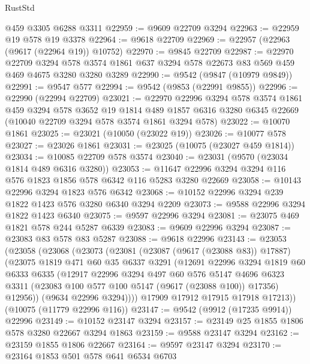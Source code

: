 \begin{lexlean}{RustStd}
\begin{coremodule}
{\begin{coremodule}
{{{{{{{{{{{{{{{{{{{{{{{{{{{{{{{{{    @459
    @3305
    @6288
    @3311
@22959 := @9609 @22709 @3294
@22963 := @22959 @19 @578 @19 @3378
@22964 := @9618 @22709
@22969 := @22957 (@22963 (@9617 (@22964 @19)) @10752)
@22970 := @9845 @22709
@22987 := @22970
    @22709
    @3294
    @578
    @3574
    @1861
    @637
    @3294
    @578
    @22673
    @83
    @569
    @459
    @469
    @4675
    @3280
    @3280
    @3289
@22990 := @9542 (@9847 (@10979 @9849))
@22991 := @9547 @577
@22994 := @9542 (@9853 (@22991 @9855))
@22996 := @22990 (@22994 @22709)
@23021 := @22970
    @22996
    @3294
    @578
    @3574
    @1861
    @459
    @3294
    @578
    @3652
    @19
    @1814
    @489
    @1857
    @6316
    @3280
    @6345
    @22669
    (@10040 @22709 @3294 @578 @3574 @1861 @3294 @578)
@23022 := @10070 @1861
@23025 := @23021 (@10050 (@23022 @19))
@23026 := @10077 @578
@23027 := @23026 @1861
@23031 := @23025 (@10075 (@23027 @459 @1814))
@23034 := @10085 @22709 @578 @3574
@23040 := @23031 (@9570 (@23034 @1814 @489 @6316 @3280))
@23053 := @11647 @22996 @3294 @3294 @116 @576 @1823 @1856 @578 @6342 @116 @5283 @3280 @22669
@23058 := @10143 @22996 @3294 @1823 @576 @6342
@23068 := @10152 @22996 @3294 @239 @1822 @1423 @576 @3280 @6340 @3294 @2209
@23073 := @9588 @22996 @3294 @1822 @1423 @6340
@23075 := @9597 @22996 @3294
@23081 := @23075 @469 @1821 @578 @244 @5287 @6339
@23083 := @9609 @22996 @3294
@23087 := @23083 @83 @578 @83 @5287
@23088 := @9618 @22996
@23143 := @23053
    (@23058
      (@23068
        (@23073
          (@23081
            (@23087 (@9617 (@23088 @83)) @17887)
            (@23075
              @1819
              @471
              @60
              @35
              @6337
              @3291
              (@12691
                @22996
                @3294
                @1819
                @60
                @6333
                @6335
                (@12917
                  @22996
                  @3294
                  @497
                  @60
                  @576
                  @5147
                  @4696
                  @6323
                  @3311
                  (@23083 @100 @577 @100 @5147 (@9617 (@23088 @100)) @17356)
                  @12956))
              (@9634 @22996 @3294))))
        @17909
        @17912
        @17915
        @17918
        @17213))
    (@10075 (@11779 @22996 @116))
@23147 := @9542 (@9912 (@17235 @9914)) @22996
@23149 := @10152 @23147 @3294
@23157 := @23149 @25 @1855 @1806 @578 @3280 @22667 @3294 @1863
@23159 := @9588 @23147 @3294
@23162 := @23159 @1855 @1806 @22667
@23164 := @9597 @23147 @3294
@23170 := @23164 @1853 @501 @578 @641 @6534 @6703
}}}}}}}}}}}}}}}}}}}}}}}}}}}}}}}}}
\end{coremodule}}
\end{coremodule}
\end{lexlean}
